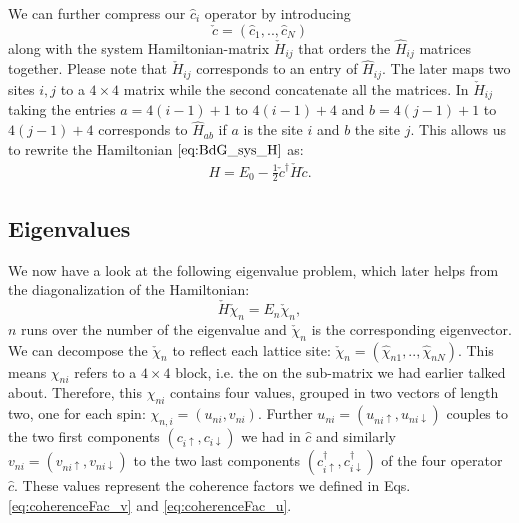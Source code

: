\documentclass[../main.tex]{subfile}
\begin{document}
We can further compress our $\hat{c}_i$ operator by introducing 
\[
    \check{c} = (\hat{c}_1,..,\hat{c}_N)
\] 
along with the system Hamiltonian-matrix $\check{H}_{ij}$ that orders the $\hat{H}_{ij}$ matrices together.  
Please note that $\check{H}_{ij}$ corresponds to an entry of $\hat{H}_{ij}$. The later maps two sites $i,j$ to a $4\times4$ matrix while the second concatenate all the matrices.
In $\check{H}_{ij}$ taking the entries $a=4(i-1) + 1$ to $4(i-1) + 4$ and $b=4(j-1) + 1$ to $4(j-1) + 4$ corresponds to $\hat{H}_{ab}$ if $a$ is the site $i$ and $b$ the site $j$.
This allows us to rewrite the Hamiltonian $\ref{eq:BdG_sys_H}$ as:
\begin{align}
    H = E_0 - \frac{1}{2} \check{c}^\dagger \check{H} \check{c}.
\end{align}
\subsection{Eigenvalues}
We now have a look at the following eigenvalue problem, which later helps from the diagonalization of the Hamiltonian:
\begin{equation}
    \label{eq:BdG_eigenVal_H} 
    \check{H} \check{\chi}_n = E_n \check{\chi}_n,
\end{equation}
$n$ runs over the number of the eigenvalue and $\check{\chi}_n$ is the corresponding eigenvector.
We can decompose the $\check{\chi}_n$ to reflect each lattice site: $\check{\chi}_n = (\hat{\chi}_{n1},..,\hat{\chi}_{nN})$. 
This means $\chi_{ni}$ refers to a $4\times4$ block, i.e. the on the sub-matrix we had earlier talked about.
Therefore, this $\chi_{ni}$ contains four values, grouped in two vectors of length two, one for each spin: $\chi_{n,i} = (u_{ni}, v_{ni})$.
Further $u_{ni} = (u_{ni\uparrow}, u_{ni\downarrow})$ couples to the two first components $(c_{i\uparrow},c_{i\downarrow})$ we had in $\hat{c}$ and 
similarly $v_{ni} = (v_{ni\uparrow}, v_{ni\downarrow})$ to the two last components $(c_{i\uparrow}^{\dagger},c_{i\downarrow}^{\dagger})$ of
the four operator $\hat{c}$. These values represent the coherence factors we defined in Eqs.\ref{eq:coherenceFac_v} and \ref{eq:coherenceFac_u}.\\ 
\end{document}
